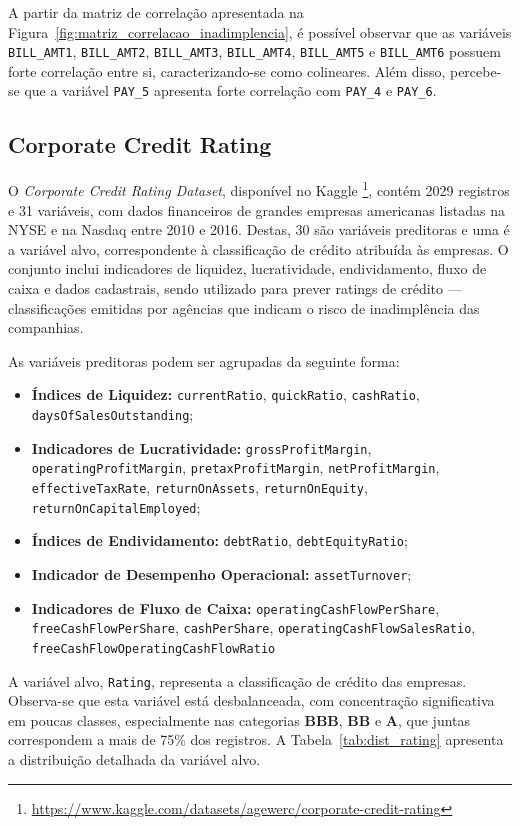 A partir da matriz de correlação apresentada na Figura~\ref{fig:matriz_correlacao_inadimplencia}, é possível observar que as variáveis \texttt{BILL\_AMT1}, \texttt{BILL\_AMT2}, \texttt{BILL\_AMT3}, \texttt{BILL\_AMT4}, \texttt{BILL\_AMT5} e \texttt{BILL\_AMT6} possuem forte correlação entre si, caracterizando-se como colineares. Além disso, percebe-se que a variável \texttt{PAY\_5} apresenta forte correlação com \texttt{PAY\_4} e \texttt{PAY\_6}.

\subsection{Corporate Credit Rating}

O \textit{Corporate Credit Rating Dataset}, disponível no Kaggle \footnote{\url{https://www.kaggle.com/datasets/agewerc/corporate-credit-rating}}, contém 2029 registros e 31 variáveis, com dados financeiros de grandes empresas americanas listadas na NYSE e na Nasdaq entre 2010 e 2016. Destas, 30 são variáveis preditoras e uma é a variável alvo, correspondente à classificação de crédito atribuída às empresas. O conjunto inclui indicadores de liquidez, lucratividade, endividamento, fluxo de caixa e dados cadastrais, sendo utilizado para prever ratings de crédito — classificações emitidas por agências que indicam o risco de inadimplência das companhias.

As variáveis preditoras podem ser agrupadas da seguinte forma:

\begin{sloppypar}
\begin{itemize}
    \item \textbf{Índices de Liquidez:} \texttt{currentRatio}, \texttt{quickRatio}, \texttt{cashRatio}, \texttt{daysOfSalesOutstanding};
    \item \textbf{Indicadores de Lucratividade:} \texttt{grossProfitMargin}, \texttt{operatingProfitMargin}, \texttt{pretaxProfitMargin}, \texttt{netProfitMargin}, \texttt{effectiveTaxRate}, \texttt{returnOnAssets}, \texttt{returnOnEquity}, \texttt{returnOnCapitalEmployed};
    \item \textbf{Índices de Endividamento:} \texttt{debtRatio}, \texttt{debtEquityRatio};
    \item \textbf{Indicador de Desempenho Operacional:} \texttt{assetTurnover};
    \item \textbf{Indicadores de Fluxo de Caixa:} \texttt{operatingCashFlowPerShare}, \texttt{freeCashFlowPerShare}, \texttt{cashPerShare}, \texttt{operatingCashFlowSalesRatio}, \texttt{freeCashFlowOperatingCashFlowRatio}
\end{itemize}
A variável alvo, \texttt{Rating}, representa a classificação de crédito das empresas. Observa-se que esta variável está desbalanceada, com concentração significativa em poucas classes, especialmente nas categorias \textbf{BBB}, \textbf{BB} e \textbf{A}, que juntas correspondem a mais de 75\% dos registros. A Tabela~\ref{tab:dist_rating} apresenta a distribuição detalhada da variável alvo.
\end{sloppypar}

